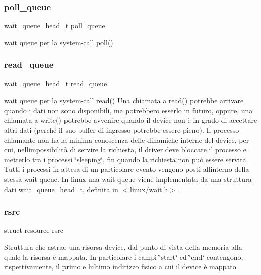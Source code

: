 \subsubsection{\texorpdfstring{poll\+\_\+queue}{poll\_queue}}
{\footnotesize\ttfamily wait\+\_\+queue\+\_\+head\+\_\+t poll\+\_\+queue}

wait queue per la system-\/call poll() \mbox{\label{structmy_g_p_i_o_k__t_a251570f8e6976ad87411093e330e7b4f}} 
\subsubsection{\texorpdfstring{read\+\_\+queue}{read\_queue}}
{\footnotesize\ttfamily wait\+\_\+queue\+\_\+head\+\_\+t read\+\_\+queue}

wait queue per la system-\/call read() Una chiamata a read() potrebbe arrivare quando i dati non sono disponibili, ma potrebbero esserlo in futuro, oppure, una chiamata a write() potrebbe avvenire quando il device non è in grado di accettare altri dati (perché il suo buffer di ingresso potrebbe essere pieno). Il processo chiamante non ha la minima conoscenza delle dinamiche interne del device, per cui, nell\textquotesingle{}impossibilità di servire la richiesta, il driver deve bloccare il processo e metterlo tra i processi \char`\"{}sleeping\char`\"{}, fin quando la richiesta non può essere servita. Tutti i processi in attesa di un particolare evento vengono posti all\textquotesingle{}interno della stessa wait queue. In linux una wait queue viene implementata da una struttura dati wait\+\_\+queue\+\_\+head\+\_\+t, definita in $<$linux/wait.\+h$>$. \mbox{\label{structmy_g_p_i_o_k__t_a565a1848c3ae8026257a74cf169c6941}} 
\subsubsection{\texorpdfstring{rsrc}{rsrc}}
{\footnotesize\ttfamily struct resource rsrc}

Struttura che astrae una risorsa device, dal punto di vista della memoria alla quale la risorsa è mappata. In particolare i campi \char`\"{}start\char`\"{} ed \char`\"{}end\char`\"{} contengono, rispettivamente, il primo e l\textquotesingle{}ultimo indirizzo fisico a cui il device è mappato. \mbox{\label{structmy_g_p_i_o_k__t_a0f87b53dc5049a349ef01aa586c0b5dc}} 

